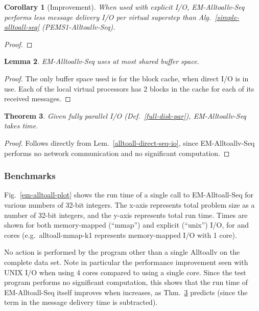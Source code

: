 \documentclass[12pt]{carletoncsthesis}
\newtheorem{thm}{Theorem}[section]
\newtheorem{lemma}[thm]{Lemma}
\newtheorem{corollary}[thm]{Corollary}
\begin{document}
\begin{corollary}[Improvement]
\label{alltoall-direct-seq-imp}
When used with explicit I/O, {\sc EM-Alltoallv-Seq} performs  less message delivery I/O per virtual
superstep than Alg.~\ref{simple-alltoall-seq} ({\sc PEMS1-Alltoallv-Seq}).
\end{corollary}
\begin{proof}

\end{proof}

\begin{lemma}
\label{alltoall-direct-seq-mem}
{\sc EM-Alltoallv-Seq} uses at most  shared buffer space.
\end{lemma}
\begin{proof}
The only buffer space used is for the block cache, when direct I/O is in use.
Each of the  local virtual processors has 2 blocks in the cache for each of
its  received messages.
\end{proof}

\begin{thm}
\label{alltoall-direct-seq-time}
Given fully parallel I/O (Def.~\ref{full-disk-par}), {\sc EM-Alltoallv-Seq}
takes  time.
\end{thm}
\begin{proof}
Follows directly from Lem.~\ref{alltoall-direct-seq-io}, since {\sc
EM-Alltoallv-Seq} performs no network communication and no significant
computation.
\end{proof}


\subsubsection{Benchmarks}


Fig.~\ref{em-alltoall-plot} shows the run time of a single call to {\sc
EM-Alltoall-Seq} for various numbers of 32-bit integers.  The x-axis represents
total problem size as a number of 32-bit integers, and the y-axis represents
total run time.  Times are shown for both memory-mapped (``mmap'') and explicit
(``unix'') I/O, for  and  cores (e.g.\ alltoall-mmap-k1 represents
memory-mapped I/O with 1 core).

No action is performed by the program other than a single {\sc Alltoallv}
on the complete data set.  Note in particular the performance improvement
seen with UNIX I/O when using 4 cores compared to using a single core.
Since the test program performs no significant computation, this shows that
the run time of {\sc EM-Alltoall-Seq} itself improves when  increases,
as Thm.~\ref{alltoall-direct-seq-time} predicts (since the  term in the
message delivery time is subtracted).
\end{document}
